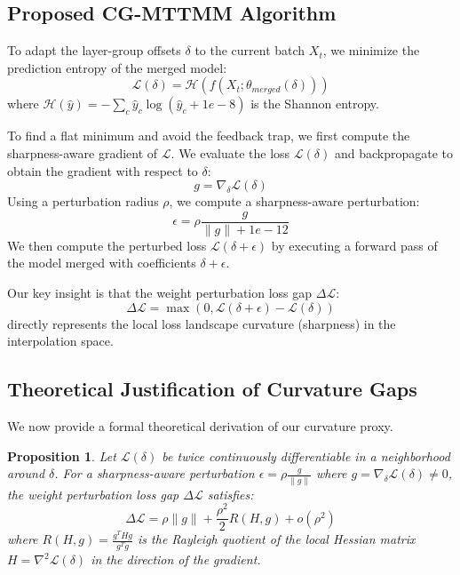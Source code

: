 \documentclass{article}
\theoremstyle{plain}
\newtheorem{proposition}[theorem]{Proposition}
\theoremstyle{definition}
\theoremstyle{remark}
\begin{document}
\subsection{Proposed CG-MTTMM Algorithm}
To adapt the layer-group offsets $\delta$ to the current batch $X_t$, we minimize the prediction entropy of the merged model:
\begin{equation}
\mathcal{L}(\delta) = \mathcal{H}(f(X_t; \theta_{merged}(\delta)))
\end{equation}
where $\mathcal{H}(\hat{y}) = - \sum_c \hat{y}_c \log(\hat{y}_c + 1e-8)$ is the Shannon entropy.

To find a flat minimum and avoid the feedback trap, we first compute the sharpness-aware gradient of $\mathcal{L}$. We evaluate the loss $\mathcal{L}(\delta)$ and backpropagate to obtain the gradient with respect to $\delta$:
\begin{equation}
g = \nabla_{\delta} \mathcal{L}(\delta)
\end{equation}
Using a perturbation radius $\rho$, we compute a sharpness-aware perturbation:
\begin{equation}
\epsilon = \rho \frac{g}{\|g\| + 1e-12}
\end{equation}
We then compute the perturbed loss $\mathcal{L}(\delta + \epsilon)$ by executing a forward pass of the model merged with coefficients $\delta + \epsilon$.

Our key insight is that the weight perturbation loss gap $\Delta \mathcal{L}$:
\begin{equation}
\Delta \mathcal{L} = \max(0, \mathcal{L}(\delta + \epsilon) - \mathcal{L}(\delta))
\end{equation}
directly represents the local loss landscape curvature (sharpness) in the interpolation space.

\subsection{Theoretical Justification of Curvature Gaps}
We now provide a formal theoretical derivation of our curvature proxy. 
\begin{proposition}
\label{prop:curvature}
Let $\mathcal{L}(\delta)$ be twice continuously differentiable in a neighborhood around $\delta$. For a sharpness-aware perturbation $\epsilon = \rho \frac{g}{\|g\|}$ where $g = \nabla_\delta \mathcal{L}(\delta) \neq 0$, the weight perturbation loss gap $\Delta \mathcal{L}$ satisfies:
\begin{equation}
\Delta \mathcal{L} = \rho \|g\| + \frac{\rho^2}{2} R(H, g) + o(\rho^2)
\end{equation}
where $R(H, g) = \frac{g^T H g}{g^T g}$ is the Rayleigh quotient of the local Hessian matrix $H = \nabla^2 \mathcal{L}(\delta)$ in the direction of the gradient.
\end{proposition}
\end{document}
